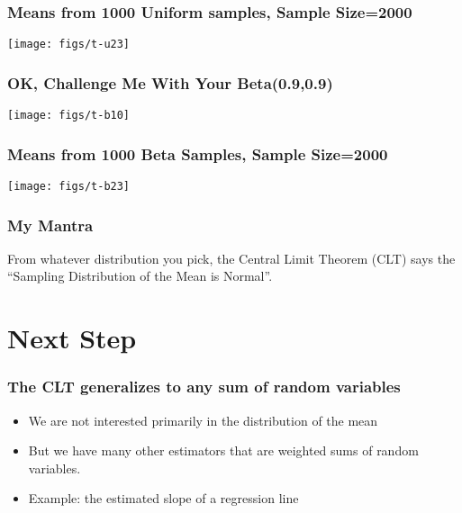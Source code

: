 \documentclass[10pt,english]{beamer}
\begin{document}
\begin{frame}
  \frametitle{Means from 1000 Uniform samples, Sample Size=2000}

 \texttt{[image: figs/t-u23]}
\end{frame}



\begin{frame}
 \frametitle{OK, Challenge Me With Your Beta(0.9,0.9)}

\texttt{[image: figs/t-b10]}
\end{frame}

\begin{frame}
  \frametitle{Means from 1000 Beta Samples, Sample Size=2000}

\texttt{[image: figs/t-b23]}
\end{frame}



\begin{frame}
 \frametitle{My Mantra}

From whatever distribution you pick, the Central Limit Theorem (CLT)
says the {}``Sampling Distribution of the Mean is Normal''.

\end{frame}

\section{Next Step}
\begin{frame}
  \frametitle{The CLT generalizes to any sum of random variables}
  \begin{itemize}
  \item We are not interested primarily in the distribution of the
    mean
  \item But we have many other estimators that are weighted sums
    of random variables.
  \item Example: the estimated slope of a regression line
  \end{itemize}
\end{frame}
\end{document}
